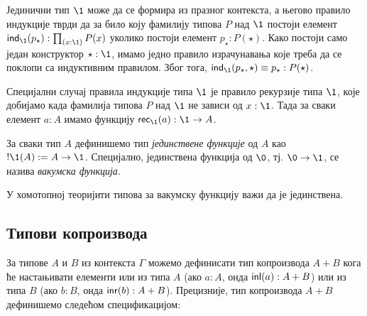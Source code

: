 \documentclass[12pt,oneside]{memoir}
\begin{document}
Јединични тип $\1$ може да се формира из празног контекста, а његово правило индукције тврди да за било коју фамилију типова $P$ над $\1$ постоји елемент $\ind{\1} (p_{\star}) : \prod_{(x : \1)} P (x)$ уколико постоји елемент $p_{\star} : P (\star)$. Како постоји само један конструктор $\star : \1$, имамо једно правило израчунавања које треба да се поклопи са индуктивним правилом. Због тога, $\ind{\1} (p_{\star}, \star) \equiv p_{\star} : P(\star)$.

Специјални случај правила индукције типа $\1$ је правило рекурзије типа $\1$, које добијамо када фамилија типова $P$ над $\1$ не зависи од $x : \1$. Тада за сваки елемент $a : A$ имамо функцију $\rec{\1} (a) : \1 \to A$. 

\begin{definition}
    За сваки тип $A$ дефинишемо тип \emph{јединствене функције} од $A$ као $!\1(A) := A \to \1$. Специјално, јединствена функција од $\0$, тј. $\0 \to \1$, се назива \emph{вакумска функција}.
\end{definition}

У хомотопној теоријити типова за вакумску функцију важи да је јединствена. 

\subsection{Типови копроизвода}

За типове $A$ и $B$ из контекста $\Gamma$ можемо дефинисати тип копроизвода $A + B$ кога ће настањивати елементи или из типа $A$ (ако $a : A$, онда $\mathsf{inl}(a) : A + B$) или из типа $B$ (ако $b : B$, онда $\mathsf{inr}(b) : A + B$). Прецизније, тип копроизвода $A + B$ дефинишемо следећом спецификацијом:
\end{document}
